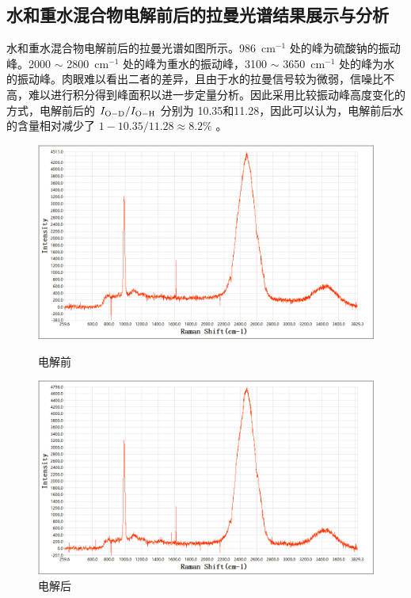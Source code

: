 \documentclass[UTF8]{article}
\newcommand{\dw}[1]{\,\mathrm{#1}}
\begin{document}
	\subsection{水和重水混合物电解前后的拉曼光谱结果展示与分析}
	水和重水混合物电解前后的拉曼光谱如图所示。986 $\dw{cm^{-1}}$ 处的峰为硫酸钠的振动峰。2000 $\sim$ 2800 $\dw{cm^{-1}}$ 处的峰为重水的振动峰，3100 $\sim$ 3650 $\dw{cm^{-1}}$ 处的峰为水的振动峰。肉眼难以看出二者的差异，且由于水的拉曼信号较为微弱，信噪比不高，难以进行积分得到峰面积以进一步定量分析。因此采用比较振动峰高度变化的方式，电解前后的 $ I_{\ce{O-D}} / I_{\ce{O-H}}$ 分别为 10.35和11.28，因此可以认为，电解前后水的含量相对减少了 $1-10.35/11.28 \approx 8.2\%$ 。
	\begin{figure}[htp]
		\begin{minipage}[t]{0.5\textwidth}
			\centering
			\includegraphics[width=\linewidth]{figures/电解水2.png} 
			\caption{电解前} \label{}
		\end{minipage}
		\begin{minipage}[t]{0.5\textwidth}
			\centering
			\includegraphics[width=\textwidth]{figures/电解水3.png}
			\caption{电解后} \label{}
		\end{minipage}
	\end{figure}
	
\end{document}
